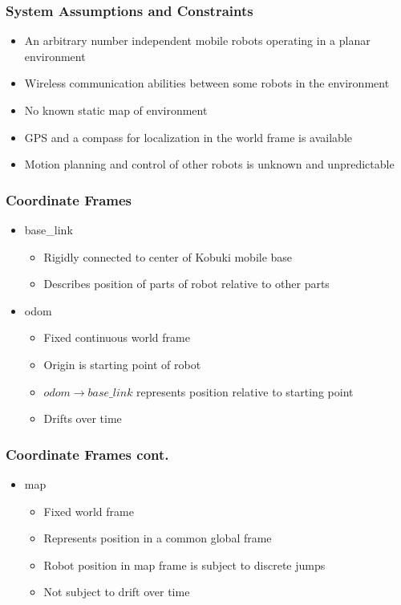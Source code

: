 \documentclass[14pt]{beamer}
\begin{document}
\begin{frame}
\frametitle{System Assumptions and Constraints}

\begin{itemize}
\item An arbitrary number independent mobile robots operating in a planar environment
\item Wireless communication abilities between some robots in the environment
\item No known static map of environment
\item GPS and a compass for localization in the world frame is available
\item Motion planning and control of other robots is unknown and unpredictable
\end{itemize}
\end{frame}

\begin{frame}
\frametitle{Coordinate Frames}
\begin{itemize}
\item base\_link
    \begin{itemize}
    \item Rigidly connected to center of Kobuki mobile base
    \item Describes position of parts of robot relative to other parts 
    \end{itemize}
\item odom
    \begin{itemize}
    \item Fixed continuous world frame
    \item Origin is starting point of robot
    \item $odom \rightarrow base\_link$ represents position relative to starting point
    \item Drifts over time
    \end{itemize}
\end{itemize}
\end{frame}

\begin{frame}
\frametitle{Coordinate Frames cont.}
\begin{itemize}
\item map
    \begin{itemize}
    \item Fixed world frame
    \item Represents position in a common global frame
    \item Robot position in map frame is subject to discrete jumps
    \item Not subject to drift over time
    \end{itemize}
\end{itemize}
\end{frame}
\end{document}
